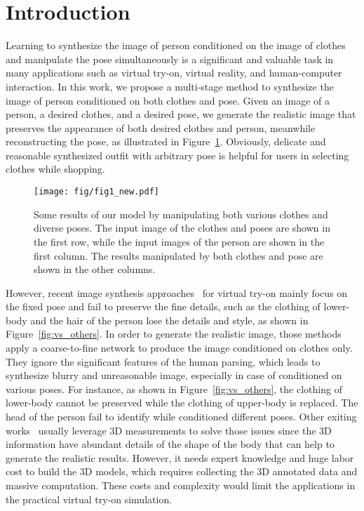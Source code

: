 \documentclass[10pt,twocolumn,letterpaper]{article}
\begin{document}
\section{Introduction}
Learning to synthesize the image of person conditioned on the image of clothes and manipulate the pose simultaneously is a significant and valuable task in many applications such as virtual try-on, virtual reality, and human-computer interaction. In this work, we propose a multi-stage method to synthesize the image of person conditioned on both clothes and pose. Given an image of a person, a desired clothes, and a desired pose, we generate the realistic image that preserves the appearance of both desired clothes and person, meanwhile reconstructing the pose, as illustrated in Figure~\ref{fig:fig1}. Obviously, delicate and reasonable synthesized outfit with arbitrary pose is helpful for users in selecting clothes while shopping.

\begin{figure}[!tp]
\centering
\texttt{[image: fig/fig1\_new.pdf]} 
\caption{Some results of our model by manipulating both various clothes and diverse poses. The input image of the clothes and poses are shown in the first row, while the input images of the person are shown in the first column. The results manipulated by both clothes and pose are shown in the other columns.}
\label{fig:fig1}
\vspace{-6mm}
\end{figure}

However, recent image synthesis approaches~\cite{han2017viton,wang2018cpvton} for virtual try-on mainly focus on the fixed pose and fail to preserve the fine details, such as the clothing of lower-body and the hair of the person lose the details and style, as shown in Figure~\ref{fig:vs_others}. In order to generate the realistic image, those methods apply a coarse-to-fine network to produce the image conditioned on clothes only. They ignore the significant features of the human parsing, which leads to synthesize blurry and unreasonable image, especially in case of conditioned on various poses. For instance,  as shown in Figure~\ref{fig:vs_others}, the clothing of lower-body cannot be preserved while the clothing of upper-body is replaced. The head of the person fail to identify while conditioned different poses. Other exiting works~\cite{laehner2018deepwrinkles,pons2017clothcap,zhang2017detailed} usually leverage 3D measurements to solve those issues since the 3D information have abundant details of the shape of the body that can help to generate the realistic results. However, it needs expert knowledge and huge labor cost to build the 3D models, which requires collecting the 3D annotated data and massive computation. These costs and complexity would limit the applications in the practical virtual try-on simulation.
\end{document}
